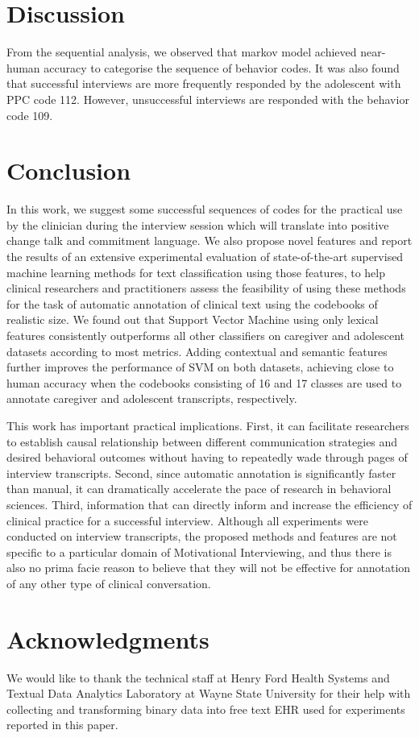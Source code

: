 \documentclass{amia}
\begin{document}
\section*{Discussion}
From the sequential analysis, we observed that markov model achieved near-human accuracy to categorise the sequence of behavior codes. It was also found that successful interviews are more frequently responded by the adolescent with PPC code 112. However, unsuccessful interviews are responded with the behavior code 109.  

\section*{Conclusion}
In this work, we suggest some successful sequences of codes for the practical use by the clinician during the interview session which will translate into positive change talk and commitment language. We also propose novel features and report the results of an extensive experimental evaluation of state-of-the-art supervised machine learning methods for text
classification using those features, to help clinical researchers and practitioners assess the feasibility of using these methods for the task of automatic annotation of clinical
text using the codebooks of realistic size. We found out that Support Vector Machine using only lexical features consistently outperforms all other classifiers on caregiver and
adolescent datasets according to most metrics. Adding contextual and semantic features further improves the performance of SVM on both datasets, achieving close to human accuracy
when the codebooks consisting of 16 and 17 classes are used to annotate caregiver and adolescent transcripts, respectively.

This work has important practical implications. First, it can facilitate researchers to establish causal relationship between different communication strategies and desired
behavioral outcomes without having to repeatedly wade through pages of interview transcripts. Second, since automatic annotation is significantly faster than manual, it can
dramatically accelerate the pace of research in behavioral sciences. Third, information that can directly inform and increase the efficiency of clinical practice for a successful interview. Although all experiments were conducted on interview transcripts, the proposed methods and features are not
specific to a particular domain of Motivational Interviewing, and thus there is also no prima facie reason to believe that they will not be effective for annotation of any other
type of clinical conversation.


\section*{Acknowledgments}
We would like to thank the technical staff at Henry Ford Health Systems and Textual Data Analytics Laboratory at Wayne State University for their help with collecting and transforming binary data into free text EHR used for experiments reported in this paper. 



\end{document}
